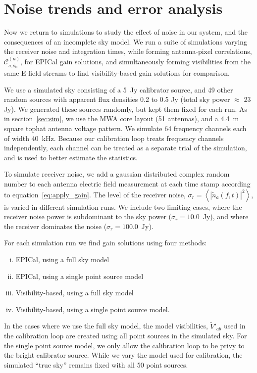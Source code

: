 \documentclass[a4paper,fleqn,usenatbib]{mnras}
\newcommand{\spix}{\ensuremath{\hat{\mathbf{s}}_{0}}}
\newcommand{\Cna}[1][n]{\ensuremath{\mathcal{C}^{(#1)}_{a,\spix}}}
\newcommand{\V}{\ensuremath{\widetilde{V}}}
\begin{document}
\section{Noise trends and error analysis}\label{sec:noise}
Now we return to simulations to study the effect of noise in our system, and the consequences of an incomplete sky model. We run a suite of simulations varying the receiver noise and integration times, while forming antenna-pixel correlations, $\Cna$, for EPICal gain solutions, and simultaneously forming visibilities from the same E-field streams to find visibility-based gain solutions for comparison. 

We use a simulated sky consisting of a 5~Jy calibrator source, and 49 other random sources with apparent flux densities 0.2 to 0.5 Jy (total sky power $\approx$ 23 Jy). We generated these sources randomly, but kept them fixed for each run. As in section~\ref{sec:sim}, we use the MWA core layout (51 antennas), and a 4.4~m square tophat antenna voltage pattern. We simulate 64 frequency channels each of width 40~kHz. Because our calibration loop treats frequency channels independently, each channel can be treated as a separate trial of the simulation, and is used to better estimate the statistics.

To simulate receiver noise, we add a gaussian distributed complex random number to each antenna electric field measurement at each time stamp according to equation~\ref{eq:apply_gain}. The level of the receiver noise, $\sigma_r = \left<\left|\widetilde{n}_a(f,t)\right|^2\right>$, is varied in different simulation runs. We include two limiting cases, where the receiver noise power is subdominant to the sky power ($\sigma_r = 10.0$~Jy), and where the receiver dominates the noise ($\sigma_r=100.0$~Jy).

For each simulation run we find gain solutions using four methods:
\begin{enumerate}[i.]
\item EPICal, using a full sky model
\item EPICal, using a single point source model
\item Visibility-based, using a full sky model
\item Visibility-based, using a single point source model.
\end{enumerate}
In the cases where we use the full sky model, the model visibilities, $\V'_{ab}$ used in the calibration loop are created using all point sources in the simulated sky. For the single point source model, we only allow the calibration loop to be privy to the bright calibrator source. While we vary the model used for calibration, the simulated ``true sky'' remains fixed with all 50 point sources.
\end{document}
